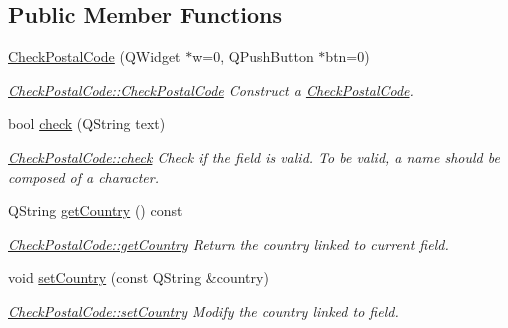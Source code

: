 \subsection*{Public Member Functions}
\begin{DoxyCompactItemize}
\item 
\hyperlink{classGui_1_1Widgets_1_1CheckFields_1_1CheckPostalCode_a31765b09c8742c26ed6b5f38be7b414b}{Check\-Postal\-Code} (Q\-Widget $\ast$w=0, Q\-Push\-Button $\ast$btn=0)
\begin{DoxyCompactList}\small\item\em \hyperlink{classGui_1_1Widgets_1_1CheckFields_1_1CheckPostalCode_a31765b09c8742c26ed6b5f38be7b414b}{Check\-Postal\-Code\-::\-Check\-Postal\-Code} Construct a \hyperlink{classGui_1_1Widgets_1_1CheckFields_1_1CheckPostalCode}{Check\-Postal\-Code}. \end{DoxyCompactList}\item 
bool \hyperlink{classGui_1_1Widgets_1_1CheckFields_1_1CheckPostalCode_a27abf247ec158aafb2c13779f6630449}{check} (Q\-String text)
\begin{DoxyCompactList}\small\item\em \hyperlink{classGui_1_1Widgets_1_1CheckFields_1_1CheckPostalCode_a27abf247ec158aafb2c13779f6630449}{Check\-Postal\-Code\-::check} Check if the field is valid. To be valid, a name should be composed of a character. \end{DoxyCompactList}\item 
Q\-String \hyperlink{classGui_1_1Widgets_1_1CheckFields_1_1CheckPostalCode_a2987b2e62bc39f5c9a56dfce31f429fe}{get\-Country} () const 
\begin{DoxyCompactList}\small\item\em \hyperlink{classGui_1_1Widgets_1_1CheckFields_1_1CheckPostalCode_a2987b2e62bc39f5c9a56dfce31f429fe}{Check\-Postal\-Code\-::get\-Country} Return the country linked to current field. \end{DoxyCompactList}\item 
void \hyperlink{classGui_1_1Widgets_1_1CheckFields_1_1CheckPostalCode_af57970124c6e10b516794f90f2b9f0be}{set\-Country} (const Q\-String \&country)
\begin{DoxyCompactList}\small\item\em \hyperlink{classGui_1_1Widgets_1_1CheckFields_1_1CheckPostalCode_af57970124c6e10b516794f90f2b9f0be}{Check\-Postal\-Code\-::set\-Country} Modify the {\itshape country} linked to field. \end{DoxyCompactList}\end{DoxyCompactItemize}
